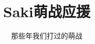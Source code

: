 \documentclass[UTF8, punct=kaiming]{ctexbook}
\begin{document}
\title{Saki萌战应援}
\author{那些年我们打过的萌战}
\maketitle

\tableofcontents



\end{document}
